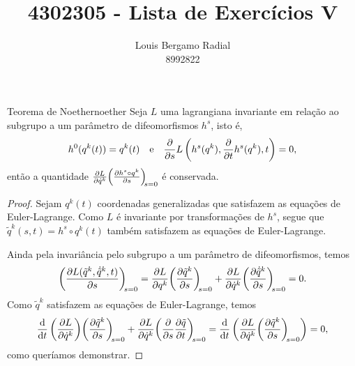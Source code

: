 \documentclass[12pt,a4paper]{article}
\title{4302305 - Lista de Exercícios V}
\author{Louis Bergamo Radial\\8992822}
\begin{document}
\maketitle

\begin{theorem}{Teorema de Noether}{noether}
    Seja \(L\) uma lagrangiana invariante em relação ao subgrupo a um parâmetro de difeomorfismos \(h^s\), isto é,
    \begin{equation*}
        h^0(q^k(t)) = q^k(t)\quad\text{e}\quad \diffp*{L\left(h^s(q^k), \diffp*{h^s(q^k)}{t}, t\right)}{s} = 0,
    \end{equation*}
    então a quantidade \(\diffp{L}{\dot{q}^k}\diffp{h^s\circ q^k}{s}[s=0]\) é conservada.
\end{theorem}
\begin{proof}
    Sejam \(q^k(t)\) coordenadas generalizadas que satisfazem as equações de Euler-Lagrange. Como \(L\) é invariante por transformações de \(h^s\), segue que \(\tilde{q}^k(s,t) = h^s\circ q^k(t)\) também satisfazem as equações de Euler-Lagrange.

    Ainda pela invariância pelo subgrupo a um parâmetro de difeomorfismos, temos
    \begin{equation*}
        \diffp{L(\tilde{q}^k, \dot{\tilde{q}}^k, t)}{s}[s=0] = \diffp{L}{q^k}\diffp{\tilde{q}^k}{s}[s=0] + \diffp{L}{\dot{q}^k}\diffp{\dot{\tilde{q}}^k}{s}[s=0] = 0.
    \end{equation*}
    Como \(\tilde{q}^k\) satisfazem as equações de Euler-Lagrange, temos
    \begin{equation*}
        \diff*{\left(\diffp{L}{\dot{q}^k}\right)}{t}\diffp{\tilde{q}^k}{s}[s=0] + \diffp{L}{\dot{q}^k}\diffp*{\diffp{\tilde{q}}{t}}{s}[s=0] = \diff*{\left(\diffp{L}{\dot{q}^k}\diffp{\tilde{q}^k}{s}[s=0]\right)}{t} = 0,
    \end{equation*}
    como queríamos demonstrar.
\end{proof}
\end{document}
